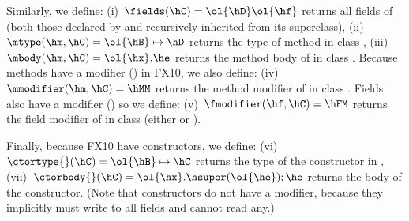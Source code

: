 \documentclass[9pt,a4paper]{article}
\begin{document}
Similarly, we define:
(i)~$\fields(\hC)=\ol{\hD} \ol{\hf}$ returns all fields of \hC (both those declared by \hC and recursively inherited from its superclass),
(ii)~$\mtype(\hm,\hC) = \ol{\hB}\mapsto\hD$ returns the type of method \hm in class \hC,
(iii)~$\mbody(\hm,\hC) = \ol{\hx}.\he$ returns the method body of \hm in class \hC.
Because methods have a modifier (\hMM) in FX10, we also define:
(iv)~$\mmodifier(\hm,\hC) = \hMM$ returns the method modifier of \hm in class \hC.
Fields also have a modifier (\hFM) so we define:
(v)~$\fmodifier(\hf,\hC) = \hFM$ returns the field modifier of \hf in class \hC (either \hval or \hvar).

Finally, because FX10 have constructors, we define:
(vi)~$\ctortype{}(\hC) = \ol{\hB}\mapsto\hC$ returns the type of the constructor in \hC,
(vii)~$\ctorbody{}(\hC) = \ol{\hx}.\hsuper(\ol{\he});\he$ returns the body of the constructor.
(Note that constructors do not have a modifier, because they implicitly must write to all fields and cannot read any.)
\end{document}
